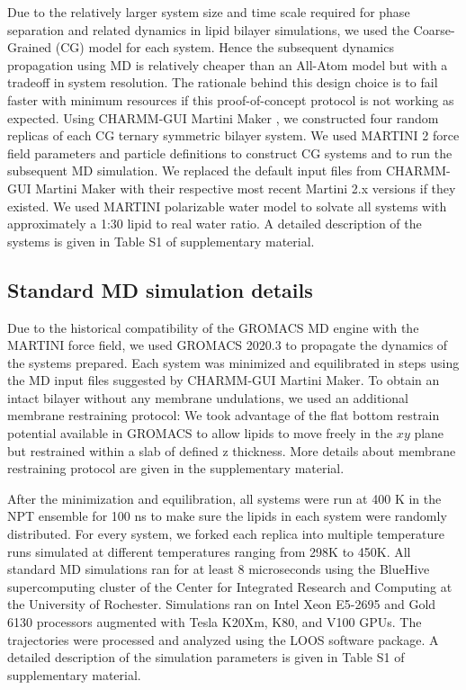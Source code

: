 \documentclass{biophys-new}
\begin{document}
Due to the relatively larger system size and time scale required for phase separation and related dynamics in lipid bilayer simulations, we used the Coarse-Grained (CG) model for each system. Hence the subsequent dynamics propagation using MD is relatively cheaper than an All-Atom model but with a tradeoff in system resolution.
The rationale behind this design choice is to fail faster with minimum resources if this proof-of-concept protocol is not working as expected. 
Using CHARMM-GUI Martini Maker \cite{Qi2015}, we constructed four random replicas of each CG ternary symmetric bilayer system.
We used MARTINI 2 force field parameters and particle definitions\cite{Marrink2007, DeJong2013} to construct CG systems and to run the subsequent MD simulation.
We replaced the default input files from CHARMM-GUI Martini Maker with their respective most recent Martini 2.x versions if they existed.
We used MARTINI polarizable water model\cite{Yesylevskyy2010} to solvate all systems with approximately a 1:30 lipid to real water ratio.
A detailed description of the systems is given in Table S1 of supplementary material.

\subsection*{Standard MD simulation details}

Due to the historical compatibility of the GROMACS MD engine with the MARTINI force field, we used GROMACS 2020.3\cite{Abraham2015} to propagate the dynamics of the systems prepared. 
Each system was minimized and equilibrated in steps using the MD input files suggested by CHARMM-GUI Martini Maker.
To obtain an intact bilayer without any membrane undulations, we used an additional membrane restraining protocol: 
We took advantage of the flat bottom restrain potential available in GROMACS to allow lipids to move freely in the $xy$ plane but restrained within a slab of defined z thickness.
More details about membrane restraining protocol are given in the supplementary material.

After the minimization and equilibration, all systems were run at 400 K in the NPT ensemble for 100 ns to make sure the lipids in each system were randomly distributed.
For every system, we forked each replica into multiple temperature runs simulated at different temperatures ranging from 298K to 450K.
All standard MD simulations ran for at least 8 microseconds using the BlueHive supercomputing cluster of the Center for Integrated Research and Computing at the University of Rochester.
Simulations ran on Intel Xeon E5-2695 and Gold 6130 processors augmented with Tesla K20Xm, K80, and V100 GPUs.   
The trajectories were processed and analyzed using the LOOS software package.
A detailed description of the simulation parameters is given in Table S1 of supplementary material. 
\end{document}
